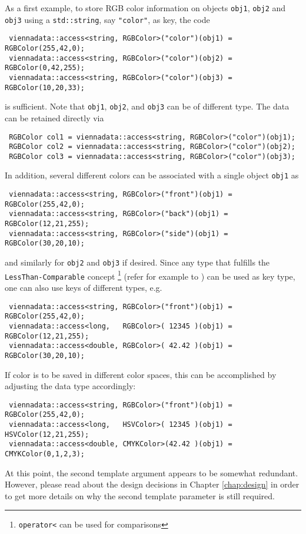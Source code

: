 As a first example, to store RGB color information on objects \lstinline|obj1|, \lstinline|obj2| and \lstinline|obj3| using a \lstinline|std::string|, say \lstinline|"color"|, as key,
the code
\begin{lstlisting}
 viennadata::access<string, RGBColor>("color")(obj1) = RGBColor(255,42,0);
 viennadata::access<string, RGBColor>("color")(obj2) = RGBColor(0,42,255);
 viennadata::access<string, RGBColor>("color")(obj3) = RGBColor(10,20,33);
\end{lstlisting}
is sufficient. Note that \lstinline|obj1|, \lstinline|obj2|, and \lstinline|obj3| can be of different type.
The data can be retained directly via
\begin{lstlisting}
 RGBColor col1 = viennadata::access<string, RGBColor>("color")(obj1);
 RGBColor col2 = viennadata::access<string, RGBColor>("color")(obj2);
 RGBColor col3 = viennadata::access<string, RGBColor>("color")(obj3);
\end{lstlisting}
In addition, several different colors can be associated with a single object \lstinline|obj1|
as
\begin{lstlisting}
 viennadata::access<string, RGBColor>("front")(obj1) = RGBColor(255,42,0);
 viennadata::access<string, RGBColor>("back")(obj1) = RGBColor(12,21,255);
 viennadata::access<string, RGBColor>("side")(obj1) = RGBColor(30,20,10);
\end{lstlisting}
and similarly for \lstinline|obj2| and \lstinline|obj3| if desired.
 Since any type that fulfills the \lstinline|LessThan-Comparable| concept
\footnote{\lstinline|operator<| can be used for comparisons} (refer for example to \cite{Austern:GenericProgrammingSTL}) can be used as key type, one can also use keys of different types, e.g.
\begin{lstlisting}
 viennadata::access<string, RGBColor>("front")(obj1) = RGBColor(255,42,0);
 viennadata::access<long,   RGBColor>( 12345 )(obj1) = RGBColor(12,21,255);
 viennadata::access<double, RGBColor>( 42.42 )(obj1) = RGBColor(30,20,10);
\end{lstlisting}
If color is to be saved in different color spaces, this can be accomplished by adjusting the data type accordingly:
\begin{lstlisting}
 viennadata::access<string, RGBColor>("front")(obj1) = RGBColor(255,42,0);
 viennadata::access<long,   HSVColor>( 12345 )(obj1) = HSVColor(12,21,255);
 viennadata::access<double, CMYKColor>(42.42 )(obj1) = CMYKColor(0,1,2,3);
\end{lstlisting}
At this point, the second template argument appears to be somewhat redundant.
However, please read about the design decisions in Chapter \ref{chap:design} in order to get more details on why the second template parameter is still required.


